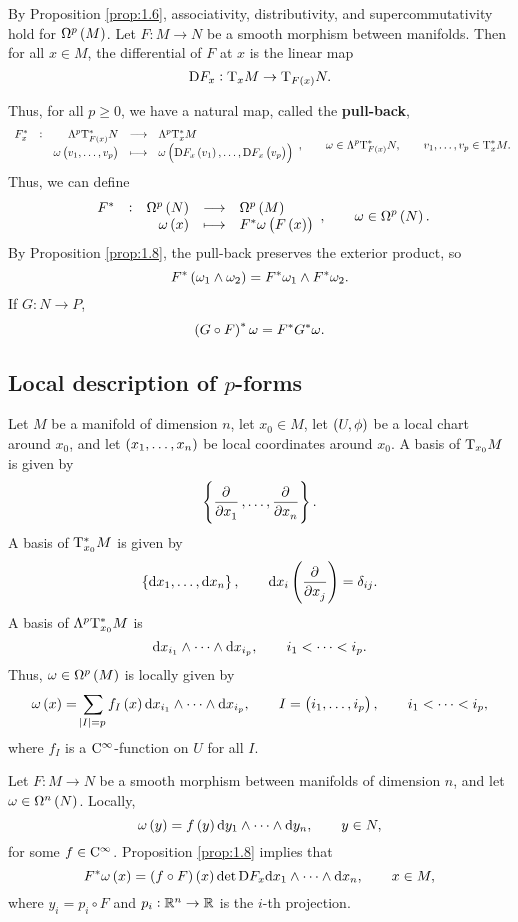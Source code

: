 By Proposition \ref{prop:1.6}, associativity, distributivity, and supercommutativity hold for $ \Omega^p\br{M} $. Let $ F : M \to N $ be a smooth morphism between manifolds. Then for all $ x \in M $, the differential of $ F $ at $ x $ is the linear map
$$ \D F_x : \T_xM \to \T_{F\br{x}}N. $$

\pagebreak

Thus, for all $ p \ge 0 $, we have a natural map, called the \textbf{pull-back},
$$ \function[F_x^*]{\Lambda^p\T_{F\br{x}}^*N}{\Lambda^p\T_x^*M}{\omega\br{v_1, \dots, v_p}}{\omega\br{\D F_x\br{v_1}, \dots, \D F_x\br{v_p}}}, \qquad \omega \in \Lambda^p\T_{F\br{x}}^*N, \qquad v_1, \dots, v_p \in \T_x^*M. $$
Thus, we can define
$$ \function[F^*]{\Omega^p\br{N}}{\Omega^p\br{M}}{\omega\br{x}}{F^*\omega\br{F\br{x}}}, \qquad \omega \in \Omega^p\br{N}. $$
By Proposition \ref{prop:1.8}, the pull-back preserves the exterior product, so
$$ F^*\br{\omega_1 \wedge \omega_2} = F^*\omega_1 \wedge F^*\omega_2. $$
If $ G : N \to P $,
$$ \br{G \circ F}^*\omega = F^*G^*\omega. $$

\subsection{Local description of \texorpdfstring{$ p $}{p}-forms}

Let $ M $ be a manifold of dimension $ n $, let $ x_0 \in M $, let $ \br{U, \phi} $ be a local chart around $ x_0 $, and let $ \br{x_1, \dots, x_n} $ be local coordinates around $ x_0 $. A basis of $ \mathrm{T}_{x_0}M $ is given by
$$ \cbr{\dpd{}{x_1}, \dots, \dpd{}{x_n}}. $$
A basis of $ \mathrm{T}_{x_0}^*M $ is given by
$$ \cbr{\d x_1, \dots, \d x_n}, \qquad \d x_i\br{\dpd{}{x_j}} = \delta_{ij}. $$
A basis of $ \Lambda^p\mathrm{T}_{x_0}^*M $ is
$$ \mathrm{d} x_{i_1} \wedge \dots \wedge \mathrm{d} x_{i_p}, \qquad i_1 < \dots < i_p. $$
Thus, $ \omega \in \Omega^p\br{M} $ is locally given by
$$ \omega\br{x} = \sum_{\abs{I} = p} f_I\br{x} \d x_{i_1} \wedge \dots \wedge \d x_{i_p}, \qquad I = \br{i_1, \dots, i_p}, \qquad i_1 < \dots < i_p, $$
where $ f_I $ is a $ \mathrm{C}^\infty $-function on $ U $ for all $ I $.

\begin{example}
Let $ F : M \to N $ be a smooth morphism between manifolds of dimension $ n $, and let $ \omega \in \Omega^n\br{N} $. Locally,
$$ \omega\br{y} = f\br{y} \d y_1 \wedge \dots \wedge \d y_n, \qquad y \in N, $$
for some $ f \in \mathrm{C}^\infty $. Proposition \ref{prop:1.8} implies that
$$ F^*\omega\br{x} = \br{f \circ F}\br{x}\det \D F_x \d x_1 \wedge \dots \wedge \d x_n, \qquad x \in M, $$
where $ y_i = p_i \circ F $ and $ p_i : \mathbb{R}^n \to \mathbb{R} $ is the $ i $-th projection.
\end{example}

